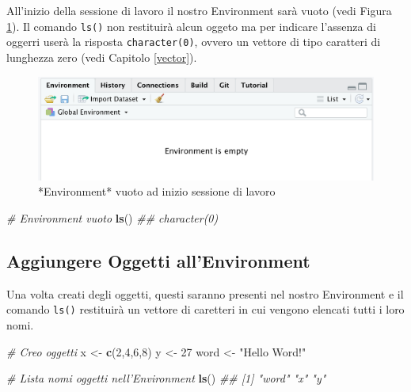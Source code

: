 \documentclass[
]{book}
\newenvironment{Shaded}{\begin{snugshade}}{\end{snugshade}}
\newcommand{\CommentTok}[1]{\textcolor[rgb]{0.56,0.35,0.01}{\textit{#1}}}
\newcommand{\DecValTok}[1]{\textcolor[rgb]{0.00,0.00,0.81}{#1}}
\newcommand{\KeywordTok}[1]{\textcolor[rgb]{0.13,0.29,0.53}{\textbf{#1}}}
\newcommand{\NormalTok}[1]{#1}
\newcommand{\StringTok}[1]{\textcolor[rgb]{0.31,0.60,0.02}{#1}}
\begin{document}
All'inizio della sessione di lavoro il nostro Environment sarà vuoto (vedi Figura \ref{fig:environment-empty}). Il comando \texttt{ls()} non restituirà alcun oggeto ma per indicare l'assenza di oggerri userà la risposta \texttt{character(0)}, ovvero un vettore di tipo caratteri di lunghezza zero (vedi Capitolo \ref{vector}).

\begin{figure}

{\centering \includegraphics[width=0.6\linewidth]{images/environment-empty} 

}

\caption{*Environment* vuoto ad inizio sessione di lavoro}\label{fig:environment-empty}
\end{figure}

\begin{Shaded}
\begin{Highlighting}[]
\CommentTok{# Environment vuoto}
\KeywordTok{ls}\NormalTok{()}
\CommentTok{## character(0)}
\end{Highlighting}
\end{Shaded}

\hypertarget{aggiungere-oggetti-allenvironment}{%
\subsection{Aggiungere Oggetti all'Environment}\label{aggiungere-oggetti-allenvironment}}

Una volta creati degli oggetti, questi saranno presenti nel nostro Environment e il comando \texttt{ls()} restituirà un vettore di caretteri in cui vengono elencati tutti i loro nomi.

\begin{Shaded}
\begin{Highlighting}[]
\CommentTok{# Creo oggetti}
\NormalTok{x <-}\StringTok{  }\KeywordTok{c}\NormalTok{(}\DecValTok{2}\NormalTok{,}\DecValTok{4}\NormalTok{,}\DecValTok{6}\NormalTok{,}\DecValTok{8}\NormalTok{)}
\NormalTok{y <-}\StringTok{  }\DecValTok{27}
\NormalTok{word <-}\StringTok{ "Hello Word!"}

\CommentTok{# Lista nomi oggetti nell'Environment}
\KeywordTok{ls}\NormalTok{()}
\CommentTok{## [1] "word" "x"    "y"}
\end{Highlighting}
\end{Shaded}
\end{document}
